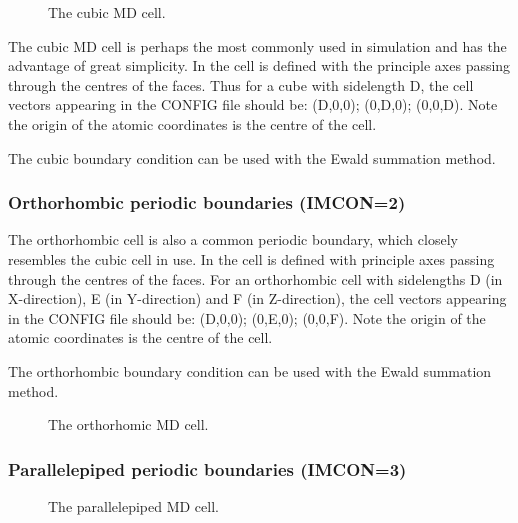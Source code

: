 \begin{figure}[ht]
\begin{center}
\centerline{}
\caption{The cubic MD cell.}
\end{center}
\end{figure}

The cubic MD cell is perhaps the most commonly used in simulation and
has the advantage of great simplicity. In \D{} the cell is defined with
the principle axes passing through the centres of the faces.  Thus for
a cube with sidelength D, the cell vectors appearing in the CONFIG
file should be: (D,0,0); (0,D,0); (0,0,D). Note the origin of the
atomic coordinates is the centre of the cell.

The cubic boundary condition can be used with the Ewald summation
method.

\subsubsection*{Orthorhombic periodic boundaries (IMCON=2)}
The orthorhombic cell is also a common periodic boundary, which
closely resembles the cubic cell in use. In \D{} the cell is defined
with principle axes passing through the centres of the faces.  For an
orthorhombic cell with sidelengths D (in X-direction), E (in
Y-direction) and F (in Z-direction), the cell vectors appearing in the
CONFIG file should be: (D,0,0); (0,E,0); (0,0,F). Note the origin of
the atomic coordinates is the centre of the cell.


The orthorhombic boundary condition can be used with the Ewald summation
method.

\begin{figure}[ht]
\begin{center}
\centerline{}
\caption{The orthorhomic MD cell.}
\end{center}
\end{figure}

\subsubsection*{Parallelepiped periodic boundaries (IMCON=3)}

\begin{figure}[ht]
\begin{center}
\centerline{}
\caption{The parallelepiped MD cell.}
\end{center}
\end{figure}


